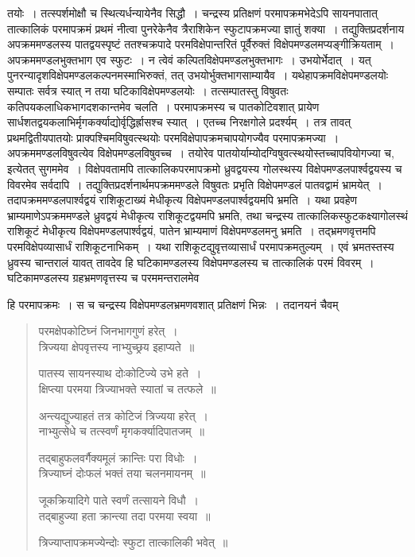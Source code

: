 \documentclass[11pt, openany]{book}
\begin{document}
\noindent तयोः~। तत्स्पर्शमोक्षौ च स्थित्यर्धन्यायेनैव सिद्धौ~। चन्द्रस्य प्रतिक्षणं परमापक्रमभेदेऽपि सायनपातात् तात्कालिकं परमापक्रमं प्रथमं नीत्वा पुनरेकेनैव त्रैराशिकेन स्फुटापक्रमज्या ज्ञातुं शक्या~। तद्युक्तिप्रदर्शनाय अपक्रममण्डलस्य पातद्वयस्पृष्टं ततश्चक्रपादे परमविक्षेपान्तरितं
पूर्वैरुक्तं विक्षेपमण्डलमप्यङ्गीक्रियताम्~। अपक्रममण्डलभुक्तभाग एव स्फुटः~। न त्वेवं कल्पितविक्षेपमण्डलभुक्तभागः~। उभयोर्भेदात्~। यत् पुनरन्यादृशविक्षेपमण्डलकल्पनमस्माभिरुक्तं, तत् उभयोर्भुक्तभागसाम्यायैव~। यथेहापक्रमविक्षेपमण्डलयोः सम्पातः सर्वत्र स्यात् न तया घटिकाविक्षेपमण्डलयोः~। तत्सम्पातस्तु विषुवतः कतिपयकलाधिकभागदशकान्तमेव चलति~। परमापक्रमस्य च पातकोटिवशात् प्रायेण सार्धशतद्वयकलाभिर्मृगकर्क्याद्योर्वृद्धिर्ह्रासश्च स्यात्~। एतच्च निरक्षगोले प्रदर्श्यम्~। तत्र तावत् प्रथमद्वितीयपातयोः प्राक्पश्चिमविषुवत्स्थयोः परमविक्षेपापक्रमचापयोगज्यैव परमापक्रमज्या~। अपक्रममण्डलविषुवत्येव विक्षेपमण्डलविषुवच्च~। तयोरेव पातयोर्याम्योदग्विषुवत्स्थयोस्तच्चापवियोगज्या च, इत्येतत् सुगममेव~। विक्षेपवतामपि तात्कालिकपरमापक्रमो ध्रुवद्वयस्य गोलस्थस्य विक्षेपमण्डलपार्श्वद्वयस्य च विवरमेव सर्वदापि~। तद्युक्तिप्रदर्शनार्थमपक्रममण्डले विषुवतः प्रभृति विक्षेपमण्डलं पातवद्वामं भ्रामयेत्~। तदापक्रममण्डलपार्श्वद्वयं राशिकूटाख्यं मेधीकृत्य विक्षेपमण्डलपार्श्वद्वयमपि भ्रमति~। यथा प्रवहेण भ्राम्यमाणेऽपक्रममण्डले ध्रुवद्वयं मेधीकृत्य
राशिकूटद्वयमपि भ्रमति, तथा चन्द्रस्य तात्कालिकस्फुटकक्ष्यागोलस्थं राशिकूटं मेधीकृत्य विक्षेपमण्डलपार्श्वद्वयं, पातेन भ्राम्यमाणं विक्षेपमण्डलमनु भ्रमति~। तद्भ्रमणवृत्तमपि परमविक्षेपव्यासार्धं राशिकूटनाभिकम्~। यथा राशिकूटद्युवृत्तव्यासार्धं परमापक्रमतुल्यम्~। एवं भ्रमतस्तस्य ध्रुवस्य चान्तरालं यावत् तावदेव हि घटिकामण्डलस्य विक्षेपमण्डलस्य च तात्कालिकं परमं विवरम्~। घटिकामण्डलस्य ग्रहभ्रमणवृत्तस्य च परममन्तरालमेव 

\newpage

\noindent हि परमापक्रमः~। स च चन्द्रस्य विक्षेपमण्डलभ्रमणवशात् प्रतिक्षणं भिन्नः~। तदानयनं चैवम्\textendash 
\begin{quote}
{\qt परमक्षेपकोटिघ्नं जिनभागगुणं हरेत्~।\\
त्रिज्यया क्षेपवृत्तस्य नाभ्युच्छ्रय इहाप्यते~॥

पातस्य सायनस्याथ दोःकोटिज्ये उभे हते~।\\
क्षिप्त्या परमया त्रिज्याभक्ते स्यातां च तत्फले~॥

अन्त्यद्युज्याहतं तत्र कोटिजं त्रिज्यया हरेत्~।\\
नाभ्युत्सेधे च तत्स्वर्णं मृगकर्क्यादिपातजम्~॥

तद्बाहुफलवर्गैक्यमूलं क्रान्तिः परा विधोः~।\\
त्रिज्याघ्नं दोःफलं भक्तं तया चलनमायनम्~॥

जूकक्रियादिगे पाते स्वर्णं तत्सायने विधौ~।\\
तद्बाहुज्या हता क्रान्त्या तदा परमया स्वया~॥

त्रिज्याप्तापक्रमज्येन्दोः स्फुटा तात्कालिकी भवेत्~॥}
\end{quote}
\end{document}
